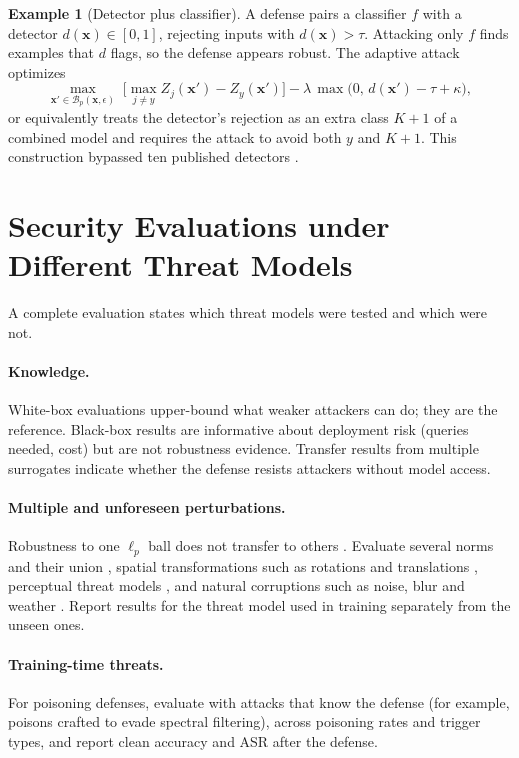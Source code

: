 \documentclass[10pt,a4paper]{extarticle}
\theoremstyle{definition}
\newtheorem{example}{Example}[section]
\newcommand{\x}{\mathbf{x}}
\newcommand{\xadv}{\mathbf{x}'}
\newcommand{\B}{\mathcal{B}}
\begin{document}
\begin{example}[Detector plus classifier]
A defense pairs a classifier \(f\) with a detector \(d(\x)\in[0,1]\), rejecting inputs with \(d(\x)>\tau\). Attacking only \(f\) finds examples that \(d\) flags, so the defense appears robust. The adaptive attack optimizes
\[
\max_{\xadv\in\B_p(\x,\epsilon)}\;\big[\max_{j\neq y}Z_j(\xadv)-Z_y(\xadv)\big]-\lambda\,\max\big(0,\,d(\xadv)-\tau+\kappa\big),
\]
or equivalently treats the detector's rejection as an extra class \(K+1\) of a combined model and requires the attack to avoid both \(y\) and \(K+1\). This construction bypassed ten published detectors \citep{carlini2017detected}.
\end{example}

\section{Security Evaluations under Different Threat Models}

A complete evaluation states which threat models were tested and which were not.

\paragraph{Knowledge.} White-box evaluations upper-bound what weaker attackers can do; they are the reference. Black-box results are informative about deployment risk (queries needed, cost) but are not robustness evidence. Transfer results from multiple surrogates indicate whether the defense resists attackers without model access.

\paragraph{Multiple and unforeseen perturbations.} Robustness to one \(\ell_p\) ball does not transfer to others \citep{tramer2019multiple}. Evaluate several norms and their union \citep{maini2020union}, spatial transformations such as rotations and translations \citep{engstrom2019spatial}, perceptual threat models \citep{laidlaw2021perceptual}, and natural corruptions such as noise, blur and weather \citep{hendrycks2019benchmarking}. Report results for the threat model used in training separately from the unseen ones.

\paragraph{Training-time threats.} For poisoning defenses, evaluate with attacks that know the defense (for example, poisons crafted to evade spectral filtering), across poisoning rates and trigger types, and report clean accuracy and ASR after the defense.
\end{document}
